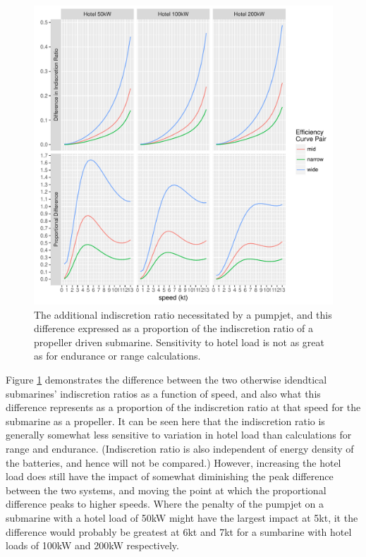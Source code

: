 \documentclass{article}\usepackage[]{graphicx}\usepackage[]{color}
\makeatletter
\def\maxwidth{ %
  \ifdim\Gin@nat@width>\linewidth
    \linewidth
  \else
    \Gin@nat@width
  \fi
}
\newenvironment{knitrout}{}{} %
\makeatother
\begin{document}
\begin{figure}
\begin{knitrout}
\color{fgcolor}

{\centering \includegraphics[width=\maxwidth]{figures/plots-plot_IR_sens-1} 

}



\end{knitrout}
\caption{The additional indiscretion ratio necessitated by a pumpjet, and this difference expressed as a proportion of the indiscretion ratio of a propeller driven submarine. Sensitivity to hotel load is not as great as for endurance or range calculations.}
\label{fig:IRs_hotel}
\end{figure}

Figure \ref{fig:IRs_hotel} demonstrates the difference between the two otherwise idendtical submarines' indiscretion ratios as a function of speed, and also what this difference represents as a proportion of the indiscretion ratio at that speed for the submarine as a propeller.  It can be seen here that the indiscretion ratio is generally somewhat less sensitive to variation in hotel load than calculations for range and endurance.  (Indiscretion ratio is also independent of energy density of the batteries, and hence will not be compared.) However, increasing the hotel load does still have the impact of somewhat diminishing the peak difference between the two systems, and moving the point at which the proportional difference peaks to higher speeds.  Where the penalty of the pumpjet on a submarine with a hotel load of 50kW might have the largest impact at 5kt, it the difference would probably be greatest at 6kt and 7kt for a sumbarine with hotel loads of 100kW and 200kW respectively.
\end{document}
